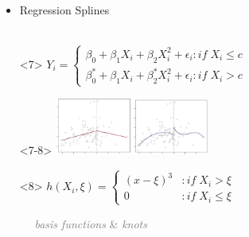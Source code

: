 \documentclass[xcolor={dvipsnames}]{beamer}
\begin{document}
{\begin{itemize}
\vspace{-1.175in}
\item<7-> Regression Splines\\${}$\\
\item[]<7> 
\vspace{.45in}
\hspace*{.0in}$Y_i = \left\{\begin{array}{ll} 
\beta_0 + \beta_1X_i + \beta_2X_i^2  +    \epsilon_i  : if  \; X_i \leq c\\
\beta_0^* + \beta_1X_i + \beta_2^*X_i^2  +  \epsilon_i  : if \; X_i > c
\end{array} \right. $
\item[]<7-8> 
\vspace{-1.4in}
\hspace*{2in}\includegraphics[width=1in]{stuff/splines1.png}\includegraphics[width=1in]{stuff/splines2.png}

\item[]<8> 
\vspace{-1in}
\hspace*{-.525in}$h(X_i,\xi) = \left\{\begin{array}{ll} 
(x - \xi)^3 &:  if \; X_i > \xi \\
0 & :  if  \; X_i \leq \xi 
\end{array} \right.$  

$\quad$ \textcolor{gray}{\emph{basis functions} \& \emph{knots}}\\


\end{itemize}}
\end{document}
